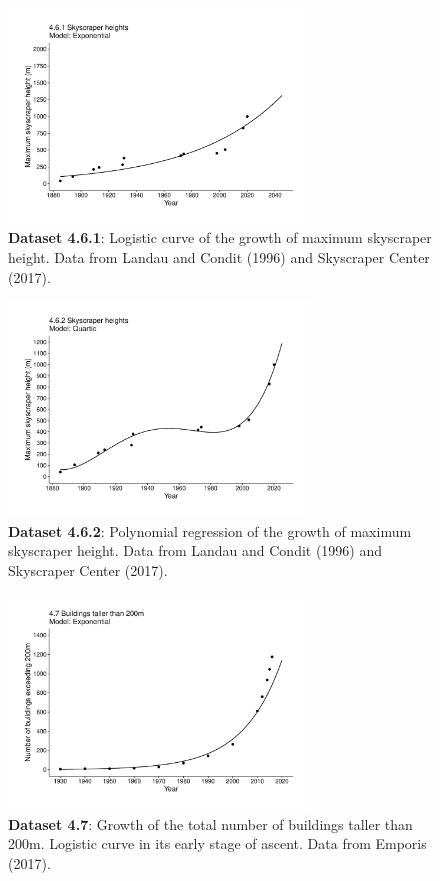 \documentclass[aps,rmp,preprint,superscriptaddress,10pt,onecolumn]{article}
\begin{document}
\begin{figure}[h]
\includegraphics[width=8cm]{output/figs-ggplot/4.6.1.pdf}
\caption{\textbf{Dataset 4.6.1}: Logistic curve of the growth of maximum skyscraper height. Data from Landau and Condit (1996) and Skyscraper Center (2017).}
\end{figure}
	
\begin{figure}[h]
\includegraphics[width=8cm]{output/figs-ggplot/4.6.2.pdf}
\caption{\textbf{Dataset 4.6.2}: Polynomial regression of the growth of maximum skyscraper height. Data from Landau and Condit (1996) and Skyscraper Center (2017). }
\end{figure}
	
\begin{figure}[h]
\includegraphics[width=8cm]{output/figs-ggplot/4.7.pdf}
\caption{\textbf{Dataset 4.7}: Growth of the total number of buildings taller than 200m. Logistic curve in its early stage of ascent. Data from Emporis (2017).}
\end{figure}
	
\end{document}
